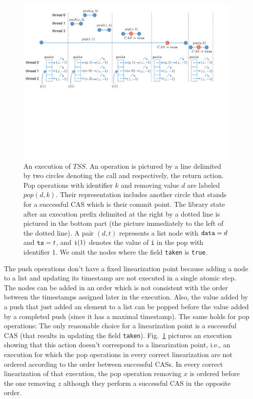 \begin{figure}[t]
\centering
\includegraphics[width=11.5cm]{fig-tss.pdf}
\vspace{-4mm}
\caption{An execution of $\mathit{TSS}$. An operation is pictured by a line delimited by two circles denoting the call and respectively, the return action. Pop operations with identifier $k$ and removing value $d$ are labeled $pop(d,k)$. Their representation includes another circle that stands for a successful CAS which is their commit point. The library state after an execution prefix delimited at the right by a dotted line is pictured in the bottom part (the picture immediately to the left of the dotted line). A pair $(d,t)$ represents a list node with ${\tt data}=d$ and ${\tt ts}=t$, and ${\tt i}(1)$ denotes the value of {\tt i} in the pop with identifier 1. We omit the nodes where the field {\tt taken} is {\tt true}.}
\label{fig:commit}
\vspace{-6mm}
\end{figure}


The push operations don't have a fixed linearization point because adding a node to a list and updating its timestamp are not executed in a single atomic step. The nodes can be added in an order which is not consistent with the order between the timestamps assigned later in the execution. Also, the value added by a push that just added an element to a list can be popped before the value added by a completed push (since it has a maximal timestamp). The same holds for pop operations: The only reasonable choice for a linearization point is a successful CAS (that results in updating the field {\tt taken}). Fig.~\ref{fig:commit} pictures an execution showing that this action doesn't correspond to a linearization point, i.e., an execution for which the pop operations in every correct linearization are not ordered according to the order between successful CASs. In every correct linearization of that execution, the pop operation removing $x$ is ordered before the one removing $z$ although they perform a successful CAS in the opposite order.

